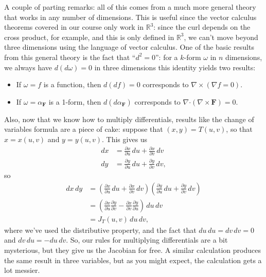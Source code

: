 \documentclass[letterpaper,12pt]{article}
\newcommand{\dotp}{\boldsymbol{\cdot}}
\newcommand{\R}{\mathbb{R}}
\newcommand{\F}{\mathbf{F}}
\newcommand{\pd}[2]{\frac{\partial #1}{\partial #2}}
\begin{document}
A couple of parting remarks: all of this comes from a much more general theory that works in any number of dimensions. This is useful since the vector calculus theorems covered in our course only work in $\R^3$: since the curl depends on the cross product, for example, and this is only defined in $\R^3$, we can't move beyond three dimensions using the language of vector calculus. One of the basic results from this general theory is the fact that ``$d^2=0$'': for a $k$-form $\omega$ in $n$ dimensions, we always have $d(d\omega)=0$ in three dimensions this identity yields two results:
\begin{itemize}
\item If $\omega = f$ is a function, then $d(df)=0$ corresponds to $\nabla\times(\nabla f=0)$.
\item If $\omega = \alpha_\F$ is a 1-form, then $d(d\alpha_\F)$ corresponds to $\nabla\dotp(\nabla\times\F)=0$.
\end{itemize}
Also, now that we know how to multiply differentials, results like the change of variables formula are a piece of cake: suppose that $(x,y) = T(u,v)$, so that $x=x(u,v)$ and $y=y(u,v)$. This gives us
\begin{align*}
dx & = \pd{x}{u}\,du+\pd{x}{v}\,dv\\
dy & = \pd{y}{u}\,du+\pd{y}{v}\,dv,
\end{align*}
so
\begin{align*}
dx\,dy &= \left(\pd{x}{u}\,du+\pd{x}{v}\,dv\right)\left(\pd{y}{u}\,du+\pd{y}{v}\,dv\right)\\
& = \left(\pd{x}{u}\pd{y}{v}-\pd{x}{v}\pd{y}{u}\right)\,du\,dv\\
& = J_T(u,v)\,du\,dv,
\end{align*}
where we've used the distributive property, and the fact that $du\,du=dv\,dv=0$ and $dv\,du = -du\,dv$. So, our rules for multiplying differentials are a bit mysterious, but they give us the Jacobian for free. A similar calculation produces the same result in three variables, but as you might expect, the calculation gets a lot messier.
\end{document}
